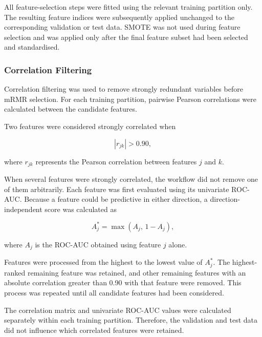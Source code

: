 \documentclass[12pt,twocolumn]{article}
\begin{document}
All feature-selection steps were fitted using the relevant training
partition only. The resulting feature indices were subsequently
applied unchanged to the corresponding validation or test data.
SMOTE was not used during feature selection and was applied only
after the final feature subset had been selected and standardised.







\subsubsection{Correlation Filtering}
\label{subsubsec:correlation_filtering}

Correlation filtering was used to remove strongly redundant variables
before mRMR selection. For each training partition, pairwise Pearson
correlations were calculated between the candidate features.

Two features were considered strongly correlated when

\begin{equation}
\left|r_{jk}\right| > 0.90,
\label{eq:correlation_threshold}
\end{equation}

where \(r_{jk}\) represents the Pearson correlation between features
\(j\) and \(k\).

When several features were strongly correlated, the workflow did not
remove one of them arbitrarily. Each feature was first evaluated using
its univariate ROC-AUC. Because a feature could be predictive in either
direction, a direction-independent score was calculated as

\begin{equation}
A^{*}_{j}
=
\max\left(A_j,\,1-A_j\right),
\label{eq:direction_independent_auc}
\end{equation}

where \(A_j\) is the ROC-AUC obtained using feature \(j\) alone.

Features were processed from the highest to the lowest value of
\(A^{*}_{j}\). The highest-ranked remaining feature was retained, and
other remaining features with an absolute correlation greater than
0.90 with that feature were removed. This process was repeated until
all candidate features had been considered.

The correlation matrix and univariate ROC-AUC values were calculated
separately within each training partition. Therefore, the validation
and test data did not influence which correlated features were
retained.
\end{document}
